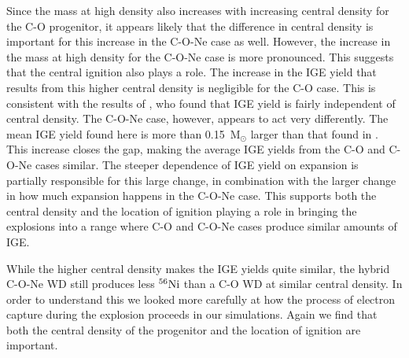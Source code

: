 \documentclass[preprint2]{aastex63}
\newcommand{\Ni}[1]{\ensuremath{{}^{#1}{\rm Ni}}}
\begin{document}
Since the mass at high density also increases with increasing central density for the C-O progenitor,
it appears likely that the difference in central density is important for this increase in the C-O-Ne case as well.
However, the increase in the mass at high density for the C-O-Ne case is more pronounced.
This suggests that the central ignition also plays a role.
The increase in the IGE yield that results from this higher central density is negligible for the C-O case.
This is consistent with the results of \citet{Kruegeretal2012}, who found that IGE yield is fairly independent of central density.
The C-O-Ne case, however, appears to act very differently.
The mean IGE yield found here is more than 0.15~M$_\odot$ larger than that found in \citet{willcoxetal2016}.
This increase closes the gap, making the average IGE yields from the C-O and C-O-Ne cases similar.
The steeper dependence of IGE yield on expansion is partially responsible for this large change, in combination with the larger change in how much expansion happens in the C-O-Ne case.
This supports both the central density and the location of ignition playing a role in bringing the explosions into a range where C-O and C-O-Ne cases produce similar amounts of IGE.

While the higher central density makes the IGE yields quite similar, the hybrid C-O-Ne WD still produces less \Ni{56} than a C-O WD at similar central density.
In order to understand this we looked more carefully at how the process of electron capture during the explosion proceeds in our simulations.
Again we find that both the central density of the progenitor and the location of ignition are important.
\end{document}
